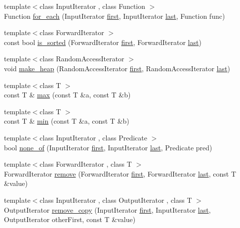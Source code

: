 \begin{DoxyCompactItemize}
{\footnotesize template$<$class Input\+Iterator , class Function $>$ }\\Function \hyperlink{namespaceprism_aae062d5bfdc0e53ae49c56520aded906}{for\+\_\+each} (Input\+Iterator \hyperlink{namespaceprism_ae3fb7a1926a9e8e59300cd5e370470da}{first}, Input\+Iterator \hyperlink{namespaceprism_abe4956c4e865f55ca126b7fb973b5078}{last}, Function func)
\item 
{\footnotesize template$<$class Forward\+Iterator $>$ }\\const bool \hyperlink{namespaceprism_acf5efbeb096446c47690b9e8bd2cc01a}{is\+\_\+sorted} (Forward\+Iterator \hyperlink{namespaceprism_ae3fb7a1926a9e8e59300cd5e370470da}{first}, Forward\+Iterator \hyperlink{namespaceprism_abe4956c4e865f55ca126b7fb973b5078}{last})
\item 
{\footnotesize template$<$class Random\+Access\+Iterator $>$ }\\void \hyperlink{namespaceprism_af8e36230e6cb92a41aaca282772a9e6e}{make\+\_\+heap} (Random\+Access\+Iterator \hyperlink{namespaceprism_ae3fb7a1926a9e8e59300cd5e370470da}{first}, Random\+Access\+Iterator \hyperlink{namespaceprism_abe4956c4e865f55ca126b7fb973b5078}{last})
\item 
{\footnotesize template$<$class T $>$ }\\const T \& \hyperlink{namespaceprism_a812456273adfa37979e79f07e731d412}{max} (const T \&a, const T \&b)
\item 
{\footnotesize template$<$class T $>$ }\\const T \& \hyperlink{namespaceprism_a10aff0aca673fb1837069dd8967e4738}{min} (const T \&a, const T \&b)
\item 
{\footnotesize template$<$class Input\+Iterator , class Predicate $>$ }\\bool \hyperlink{namespaceprism_a10c83b433c7f98fd4513f1b68c6db594}{none\+\_\+of} (Input\+Iterator \hyperlink{namespaceprism_ae3fb7a1926a9e8e59300cd5e370470da}{first}, Input\+Iterator \hyperlink{namespaceprism_abe4956c4e865f55ca126b7fb973b5078}{last}, Predicate pred)
\item 
{\footnotesize template$<$class Forward\+Iterator , class T $>$ }\\Forward\+Iterator \hyperlink{namespaceprism_aeddd21943bcf811c56f7d9d1bd4784f6}{remove} (Forward\+Iterator \hyperlink{namespaceprism_ae3fb7a1926a9e8e59300cd5e370470da}{first}, Forward\+Iterator \hyperlink{namespaceprism_abe4956c4e865f55ca126b7fb973b5078}{last}, const T \&value)
\item 
{\footnotesize template$<$class Input\+Iterator , class Output\+Iterator , class T $>$ }\\Output\+Iterator \hyperlink{namespaceprism_ab7b6fb407340e51749169560b48fb20c}{remove\+\_\+copy} (Input\+Iterator \hyperlink{namespaceprism_ae3fb7a1926a9e8e59300cd5e370470da}{first}, Input\+Iterator \hyperlink{namespaceprism_abe4956c4e865f55ca126b7fb973b5078}{last}, Output\+Iterator other\+First, const T \&value)

\end{DoxyCompactItemize}
